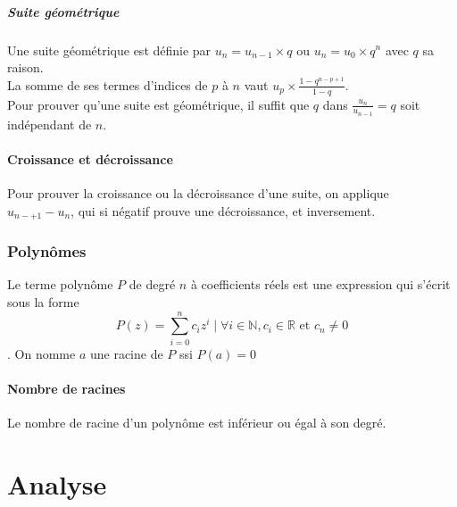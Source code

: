 \documentclass{article}
\begin{document}
\subsubsection{Suite géométrique}
Une suite géométrique est définie par $u_n = u_{n-1} \times q$ ou $u_n = u_0 \times q^n$ avec $q$ sa raison.\\
La somme de ses termes d'indices de $p$ à $n$ vaut $u_p\times \frac{1-q^{n-p+1}}{1-q}$.\\
Pour prouver qu'une suite est géométrique, il suffit que $q$ dans $\frac{u_n}{u_{n-1}} = q$ soit indépendant de $n$.


\subsection{Croissance et décroissance}
Pour prouver la croissance ou la décroissance d'une suite, on applique \\$u_{n-+1} - u_n$, qui si négatif prouve une décroissance, et inversement.



\section{Polynômes}
Le terme polynôme $P$ de degré $n$ à coefficients réels est une expression qui s'écrit sous la forme $$P(z) = \sum^n_{i=0}c_iz^i \mid \forall i \in \mathbb{N}, c_i\in \mathbb{R} \text{ et } c_n \neq 0 $$.
On nomme $a$ une racine de $P$ ssi $P(a) = 0$
\subsection{Nombre de racines}
Le nombre de racine d'un polynôme est inférieur ou égal à son degré.\\

\pagebreak\part{Analyse}
\setcounter{section}{0}
\renewcommand*{\theHsection}{chX.\the\value{section}}
\end{document}

